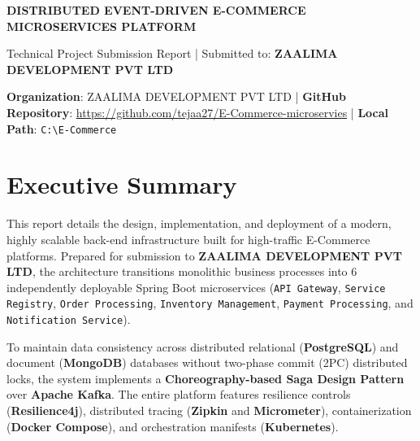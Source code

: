 \documentclass[11pt,a4paper]{article}
\begin{document}
\begin{tcolorbox}[colback=primaryDark,colframe=brandBlue,arc=3mm,boxrule=1.5pt,width=\textwidth]
    \color{white}
    \centering
    \vspace{0.15cm}
    {\Large \bfseries DISTRIBUTED EVENT-DRIVEN E-COMMERCE MICROSERVICES PLATFORM \par}
    \vspace{0.1cm}
    {\small Technical Project Submission Report | Submitted to: \textbf{ZAALIMA DEVELOPMENT PVT LTD} \par}
    \vspace{0.1cm}
\end{tcolorbox}

\vspace{0.2cm}

\begin{tcolorbox}[colback=codeBg,colframe=codeBorder,arc=2mm,width=\textwidth]
    \centering \small
    \textbf{Organization}: ZAALIMA DEVELOPMENT PVT LTD \quad | \quad 
    \textbf{GitHub Repository}: \url{https://github.com/tejaa27/E-Commerce-microservies} \quad | \quad 
    \textbf{Local Path}: \texttt{C:\textbackslash E-Commerce}
\end{tcolorbox}

\vspace{0.3cm}

\section*{Executive Summary}
This report details the design, implementation, and deployment of a modern, highly scalable back-end infrastructure built for high-traffic E-Commerce platforms. Prepared for submission to \textbf{ZAALIMA DEVELOPMENT PVT LTD}, the architecture transitions monolithic business processes into 6 independently deployable Spring Boot microservices (\texttt{API Gateway}, \texttt{Service Registry}, \texttt{Order Processing}, \texttt{Inventory Management}, \texttt{Payment Processing}, and \texttt{Notification Service}).

To maintain data consistency across distributed relational (\textbf{PostgreSQL}) and document (\textbf{MongoDB}) databases without two-phase commit (2PC) distributed locks, the system implements a \textbf{Choreography-based Saga Design Pattern} over \textbf{Apache Kafka}. The entire platform features resilience controls (\textbf{Resilience4j}), distributed tracing (\textbf{Zipkin} and \textbf{Micrometer}), containerization (\textbf{Docker Compose}), and orchestration manifests (\textbf{Kubernetes}).
\end{document}
